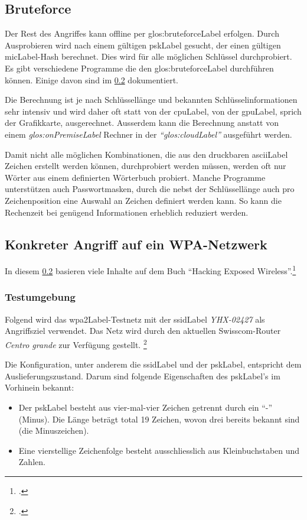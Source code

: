 \subsection{Bruteforce}
Der Rest des Angriffes kann offline per \gls{glos:bruteforceLabel} erfolgen. Durch Ausprobieren wird nach einem gültigen \gls{pskLabel} gesucht, der einen gültigen \gls{micLabel}-Hash berechnet. Dies wird für alle möglichen Schlüssel durchprobiert.
Es gibt verschiedene Programme die den \gls{glos:bruteforceLabel} durchführen können.
Einige davon sind im \cref{subsec:wpa_attack_tutorial} dokumentiert.

Die Berechnung ist je nach Schlüssellänge und bekannten Schlüsselinformationen sehr intensiv und wird daher oft statt von der \gls{cpuLabel}, von der \gls{gpuLabel}, sprich der Grafikkarte, ausgerechnet.
Ausserdem kann die Berechnung anstatt von einem \textit{\gls{glos:onPremiseLabel}} Rechner in der \textit{"`\gls{glos:cloudLabel}"'} ausgeführt werden.

Damit nicht alle möglichen Kombinationen, die aus den druckbaren \gls{asciiLabel} Zeichen erstellt werden können, durchprobiert werden müssen, werden oft nur Wörter aus einem definierten Wörterbuch probiert.
Manche Programme unterstützen auch Passwortmasken, durch die nebst der Schlüssellänge auch pro Zeichenposition eine Auswahl an Zeichen definiert werden kann. So kann die Rechenzeit bei genügend Informationen erheblich reduziert werden.


\subsection{Konkreter Angriff auf ein WPA-Netzwerk}
\label{subsec:wpa_attack_tutorial}

In diesem \cref{subsec:wpa_attack_tutorial} basieren viele Inhalte auf dem Buch "`Hacking Exposed Wireless"'.\footcite[][148ff.]{WrightCache201503}

\subsubsection{Testumgebung}
\label{subsubsec:wpa_test_environment}

Folgend wird das \gls{wpa2Label}-Testnetz mit der \gls{ssidLabel} \textit{YHX-02427} als Angriffsziel verwendet.
Das Netz wird durch den aktuellen Swisscom-Router \textit{Centro grande} zur Verfügung gestellt. \footcite{Centro_grande_Analog_Standard_-_WLAN_Router_Swisscom_2015-04-15}

Die Konfiguration, unter anderem die \gls{ssidLabel} und der \gls{pskLabel}, entspricht dem Auslieferungszustand.
Darum sind folgende Eigenschaften des \gls{pskLabel}'s im Vorhinein bekannt:
\begin{itemize}
	\item Der \gls{pskLabel} besteht aus vier-mal-vier Zeichen getrennt durch ein "`-"' (Minus). Die Länge beträgt total 19 Zeichen, wovon drei bereits bekannt sind (die Minuszeichen).
	\item Eine vierstellige Zeichenfolge besteht ausschliesslich aus Kleinbuchstaben und Zahlen.
\end{itemize}

